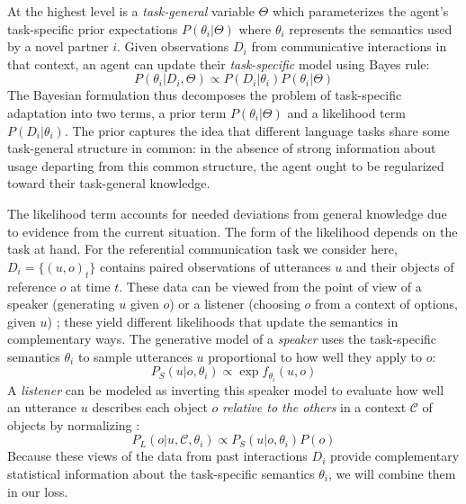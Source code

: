 At the highest level %
is a \emph{task-general} variable $\Theta$ which parameterizes the agent's task-specific prior expectations $P(\theta_{i} | \Theta)$ where $\theta_i$ represents the semantics used by a novel partner $i$. 
Given observations $D_i$ from communicative interactions in that context, an agent can update their \emph{task-specific} model using Bayes rule:
\begin{equation}
	P(\theta_i | D_i, \Theta)  \propto P(D_i | \theta_i) P(\theta_i | \Theta)
	\label{eq:lexicon_update}
\end{equation}
The Bayesian formulation thus decomposes the problem of task-specific adaptation into two terms, a prior term $ P(\theta_i | \Theta)$ and a likelihood term $P(D_i | \theta_i)$.
The prior captures the idea that different language tasks share some task-general structure in common: in the absence of strong information about usage departing from this common structure, the agent ought to be regularized toward their task-general knowledge.

The likelihood term accounts for needed deviations from general knowledge due to evidence from the current situation. 
The form of the likelihood depends on the task at hand.
For the referential communication task we consider here, $D_i = \{(u, o)_t\}$ contains paired observations of utterances $u$ and their objects of reference $o$ at time $t$.
These data can be viewed from the point of view of a speaker (generating $u$ given $o$) or a listener (choosing $o$ from a context of options, given $u$) \cite{SmithGoodmanFrank13_RecursivePragmaticReasoningNIPS,HawkinsFrankGoodman17_ConventionFormation}; these yield different likelihoods that update the semantics in complementary ways.
The generative model of a \emph{speaker} uses the task-specific semantics $\theta_i$ to sample utterances $u$ proportional to how well they apply to $o$:
\begin{equation}
	P_S(u | o, \theta_i) \propto \exp f_{\theta_i}(u, o)
	\label{eq:speaker}
\end{equation}
A \emph{listener} can be modeled as inverting this speaker model to evaluate how well an utterance $u$ describes each object $o$ \emph{relative to the others} in a context $\mathcal{C}$ of objects by normalizing \cite{FrankGoodman12_PragmaticReasoningLanguageGames,VedantamEtAl17_ContextAwareCaptions,cohn2018pragmatically,MonroeEtAl17_ColorsInContext}:
\begin{equation}
 P_L(o | u, \mathcal{C}, \theta_i) \propto 
   P_S(u | o, \theta_i )P(o) %
	\label{eq:listener}
\end{equation}
Because these views of the data from past interactions $D_{i}$ provide complementary statistical information about the task-specific semantics $\theta_i$, we will combine them in our loss.

